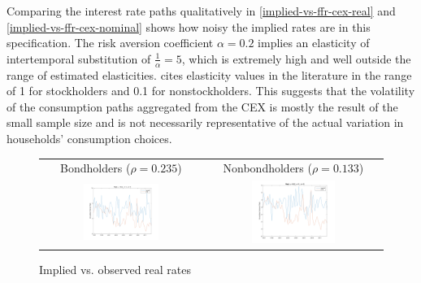 Comparing the interest rate paths qualitatively in \autoref{implied-vs-ffr-cex-real} and \autoref{implied-vs-ffr-cex-nominal} shows how noisy the implied rates are in this specification. The risk aversion coefficient $\alpha = 0.2$ implies an elasticity of intertemporal substitution of $\frac{1}{\alpha} = 5$, which is extremely high and well outside the range of estimated elasticities. \cite{guvenen06} cites elasticity values in the literature in the range of 1 for stockholders and 0.1 for nonstockholders. This suggests that the volatility of the consumption paths aggregated from the CEX is mostly the result of the small sample size and is not necessarily representative of the actual variation in households' consumption choices.

\begin{figure}[h!]
\ContinuedFloat*
\centering
\begin{tabular}{cc}
Bondholders ($\rho = 0.235$) & Nonbondholders ($\rho = 0.133$) \\
\includegraphics[width=0.49\textwidth]{figs/cex/implied-vs-ffr/bh_real} &
\includegraphics[width=0.49\textwidth]{figs/cex/implied-vs-ffr/nbh_real}
\end{tabular}
\caption{Implied vs. observed real rates}
\label{implied-vs-ffr-cex-real}
\end{figure}

